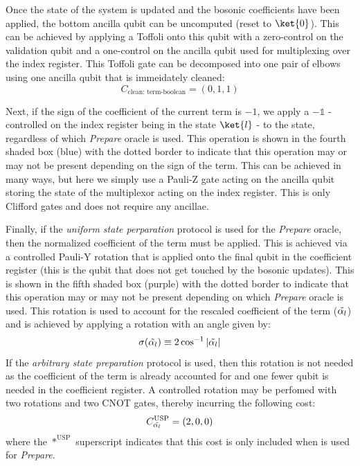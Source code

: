 Once the state of the system is updated and the bosonic coefficients have been applied, the bottom ancilla qubit can be uncomputed (reset to $\ket{0}$).
This can be achieved by applying a Toffoli onto this qubit with a zero-control on the validation qubit and a one-control on the ancilla qubit used for multiplexing over the index register.
This Toffoli gate can be decomposed into one pair of elbows using one ancilla qubit that is immeidately cleaned:
\begin{equation}
    C_{\text{clean: term-boolean}} = (0, 1, 1)
\end{equation}

Next, if the sign of the coefficient of the current term is $-1$, we apply a $- \mathds{1}$ - controlled on the index register being in the state $\ket{l}$ - to the state, regardless of which \textit{Prepare} oracle is used.
This operation is shown in the fourth shaded box (blue) with the dotted border to indicate that this operation may or may not be present depending on the sign of the term.
This can be achieved in many ways, but here we simply use a Pauli-Z gate acting on the ancilla qubit storing the state of the multiplexor acting on the index register.
This is only Clifford gates and does not require any ancillae.

Finally, if the \textit{uniform state perparation} protocol is used for the \textit{Prepare} oracle, then the normalized coefficient of the term must be applied.
This is achieved via a controlled Pauli-Y rotation that is applied onto the final qubit in the coefficient register (this is the qubit that does not get touched by the bosonic updates).
This is shown in the fifth shaded box (purple) with the dotted border to indicate that this operation may or may not be present depending on which \textit{Prepare} oracle is used.
This rotation is used to account for the rescaled coefficient of the term ($\Tilde{\alpha_l}$) and is achieved by applying a rotation with an angle given by:
\begin{equation}
    \sigma(\Tilde{\alpha_l}) \equiv 2 \cos^{-1}{|\Tilde{\alpha_l}|}
\end{equation}
If the \textit{arbitrary state preparation} protocol is used, then this rotation is not needed as the coefficient of the term is already accounted for and one fewer qubit is needed in the coefficient register.
A controlled rotation may be perfomed with two rotations and two CNOT gates, thereby incurring the following cost:
\begin{equation}
    C_{\Tilde{\alpha_l}}^\text{USP} = (2, 0, 0)
\end{equation}
where the $*^\text{USP}$ superscript indicates that this cost is only included when  is used for \textit{Prepare}.

